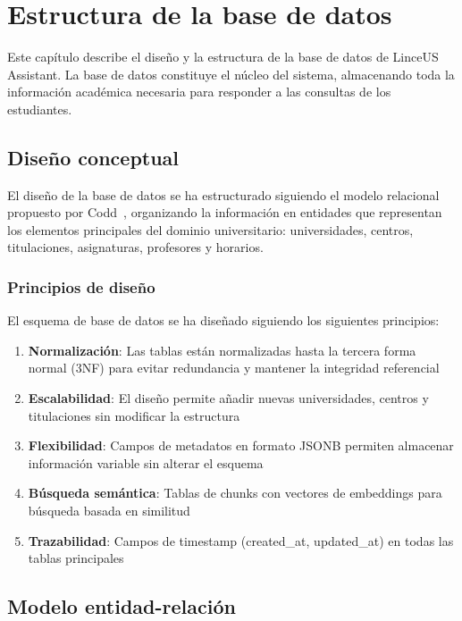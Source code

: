 
\chapter{Estructura de la base de datos}\label{cap:estructura-bd}

Este capítulo describe el diseño y la estructura de la base de datos de LinceUS Assistant. La base de datos constituye el núcleo del sistema, almacenando toda la información académica necesaria para responder a las consultas de los estudiantes.

\section{Diseño conceptual}\label{sec:diseno-conceptual}

El diseño de la base de datos se ha estructurado siguiendo el modelo relacional propuesto por Codd~\cite{codd1970relational}, organizando la información en entidades que representan los elementos principales del dominio universitario: universidades, centros, titulaciones, asignaturas, profesores y horarios.

\subsection{Principios de diseño}

El esquema de base de datos se ha diseñado siguiendo los siguientes principios:

\begin{enumerate}
    \item \textbf{Normalización}: Las tablas están normalizadas hasta la tercera forma normal (3NF) para evitar redundancia y mantener la integridad referencial
    \item \textbf{Escalabilidad}: El diseño permite añadir nuevas universidades, centros y titulaciones sin modificar la estructura
    \item \textbf{Flexibilidad}: Campos de metadatos en formato JSONB permiten almacenar información variable sin alterar el esquema
    \item \textbf{Búsqueda semántica}: Tablas de chunks con vectores de embeddings para búsqueda basada en similitud
    \item \textbf{Trazabilidad}: Campos de timestamp (created\_at, updated\_at) en todas las tablas principales
\end{enumerate}

\section{Modelo entidad-relación}\label{sec:modelo-er}


